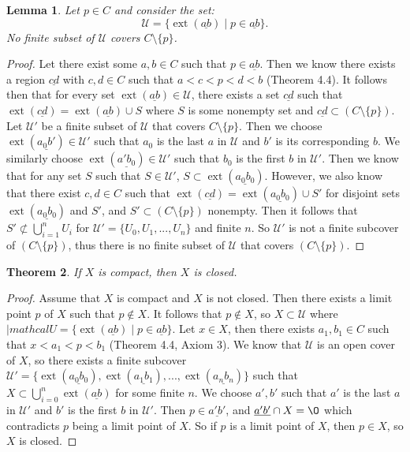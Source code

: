 \documentclass[12pt]{article}
\renewcommand{\emptyset}{\O}
\renewcommand{\_}[1]{\underline{ #1 }}
\DeclareMathOperator{\ext}{ext}
\newtheorem{theorem}{Theorem}[section]
\newtheorem{lemma}[theorem]{Lemma}
\theoremstyle{definition}
\numberwithin{equation}{subsection}
\begin{document}
\begin{lemma}  Let $p \in C$ and consider the set:
\[
\mathcal{U} = \{ \ext(\_{ab}) \mid p \in \_{ab} \}.
\]
No finite subset of $\mathcal{U}$ covers $C \setminus \{p \}$.
\end{lemma}

\begin{proof}
Let there exist some $a,b \in C$ such that $p \in \_{ab}$. Then we know there exists a region $\_{cd}$ with $c,d \in C$ such that $a < c  < p < d < b$ (Theorem 4.4). It follows then that for every set $\ext(\_{ab}) \in \mathcal{U}$, there exists a set $\_{cd}$ such that $\ext(\_{cd}) = \ext(\_{ab}) \cup S$ where $S$ is some nonempty set and $\_{cd} \subset (C \setminus \{p\})$. Let $\mathcal{U'}$ be a finite subset of $\mathcal{U}$ that covers $C \setminus \{p\}$. Then we choose $\ext(\_{a_0b'}) \in \mathcal{U'}$ such that $a_0$ is the last $a$ in $\mathcal{U}$ and $b'$ is its corresponding $b$. We similarly choose $\ext(\_{a'b_0}) \in \mathcal{U'}$ such that $b_0$ is the first $b$ in $\mathcal{U'}$. Then we know that for any set $S$ such that $S \in \mathcal{U'}$, $S \subset \ext(\_{a_0b_0})$. However, we also know that there exist $c,d \in C$ such that $\ext(\_{cd}) = \ext(\_{a_0b_0}) \cup S'$ for disjoint sets  $\ext(\_{a_0b_0})$ and $S'$, and $S' \subset (C \setminus \{p\})$ nonempty. Then it follows that $S' \not \subset \bigcup_{i=1}^nU_i$ for $\mathcal{U'} = \{U_0, U_1, ... , U_n\}$ and finite $n$. So $\mathcal{U'}$ is not a finite subcover of $(C \setminus \{p\})$, thus there is no finite subset of $\mathcal{U}$ that covers $(C \setminus \{p\})$.
\end{proof}

\begin{theorem}  If $X$ is compact, then $X$ is closed.
\end{theorem}

\begin{proof}
Assume that $X$ is compact and $X$ is not closed. Then there exists a limit point $p$ of $X$ such that $p \not \in X$. It follows that $p \not \in X$, so $X \subset \mathcal{U}$ where $|mathcal{U} = \{ \ext(\_{ab}) \mid p \in \_{ab} \}$. Let $x \in X$, then there exists $a_1,b_1 \in C$ such that $x < a_1 < p < b_1$ (Theorem 4.4, Axiom 3). We know that 
$\mathcal{U}$ is an open cover of $X$, so there exists a finite subcover $\mathcal{U'} = \{\ext(\_{a_0b_0}), \ext(\_{a_1b_1}), ... , \ext(\_{a_nb_n})\}$ such that $X \subset \bigcup_{i=0}^n\ext(\_{ab})$ for some finite $n$. We choose $a',b'$ such that $a'$ is the last $a$ in $\mathcal{U'}$ and $b'$ is the first $b$ in $\mathcal{U'}$. Then $p \in \_{a'b'}$, and $\_{a'b'} \cap X = \emptyset$ which contradicts $p$ being a limit point of $X$. So if $p$ is a limit point of $X$, then $p \in X$, so $X$ is closed.
\end{proof}
\end{document}
